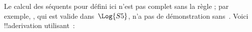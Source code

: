 \documentclass[../../../include/open-logic-section]{subfiles}
\begin{document}
\begin{ex}
Le calcul des séquents pour  défini ici n'est pas complet sans
la règle \Cut{} ; par exemple, , qui est valide dans~$\Log{S5}$, n'a pas de démonstration
sans~\Cut. Voici !!a{derivation} utilisant~\Cut :
\begin{prooftree}
\end{prooftree}
\end{ex}
\end{document}

